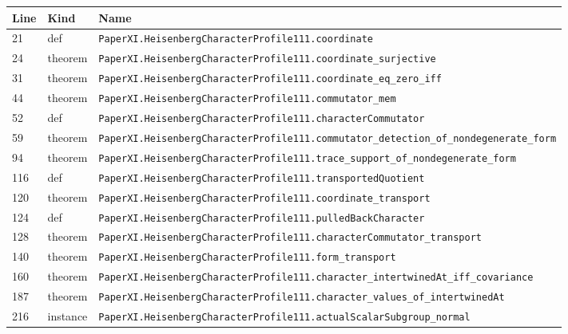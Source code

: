 \documentclass[10pt,oneside]{book}
\begin{document}
\begin{longtable}{@{}p{}p{}p{}@{}}\toprule Line&Kind&Name\\\midrule\endhead

21&def&\nolinkurl{PaperXI.HeisenbergCharacterProfile111.coordinate}\\

24&theorem&\nolinkurl{PaperXI.HeisenbergCharacterProfile111.coordinate_surjective}\\

31&theorem&\nolinkurl{PaperXI.HeisenbergCharacterProfile111.coordinate_eq_zero_iff}\\

44&theorem&\nolinkurl{PaperXI.HeisenbergCharacterProfile111.commutator_mem}\\

52&def&\nolinkurl{PaperXI.HeisenbergCharacterProfile111.characterCommutator}\\

59&theorem&\nolinkurl{PaperXI.HeisenbergCharacterProfile111.commutator_detection_of_nondegenerate_form}\\

94&theorem&\nolinkurl{PaperXI.HeisenbergCharacterProfile111.trace_support_of_nondegenerate_form}\\

116&def&\nolinkurl{PaperXI.HeisenbergCharacterProfile111.transportedQuotient}\\

120&theorem&\nolinkurl{PaperXI.HeisenbergCharacterProfile111.coordinate_transport}\\

124&def&\nolinkurl{PaperXI.HeisenbergCharacterProfile111.pulledBackCharacter}\\

128&theorem&\nolinkurl{PaperXI.HeisenbergCharacterProfile111.characterCommutator_transport}\\

140&theorem&\nolinkurl{PaperXI.HeisenbergCharacterProfile111.form_transport}\\

160&theorem&\nolinkurl{PaperXI.HeisenbergCharacterProfile111.character_intertwinedAt_iff_covariance}\\

187&theorem&\nolinkurl{PaperXI.HeisenbergCharacterProfile111.character_values_of_intertwinedAt}\\

216&instance&\nolinkurl{PaperXI.HeisenbergCharacterProfile111.actualScalarSubgroup_normal}\\


\end{longtable}
\end{document}
